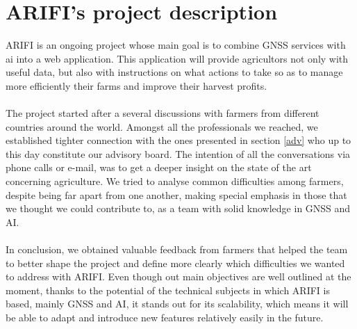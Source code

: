 \section{ARIFI's project description}

%
%
ARIFI is an ongoing project whose main goal is to combine GNSS services with \gls{ai} into a web application. This application will provide agricultors not only with useful data, but also with instructions on what actions to take so as to manage more efficiently their farms and improve their harvest profits.\\\\
%
The project started after a several discussions with farmers from different countries around the world. Amongst all the professionals we reached, we established tighter connection with the ones presented in section \ref{adv} who up to this day constitute our advisory board. The intention of all the conversations via phone calls or e-mail, was to get a deeper insight on the state of the art concerning agriculture. We tried to analyse common difficulties among farmers, despite being far apart from one another, making special emphasis in those that we thought we could contribute to, as a team with solid knowledge in GNSS and AI.\\\\
%
%
In conclusion, we obtained valuable feedback from farmers that helped the team to better shape the project and define more clearly which difficulties we wanted to address with ARIFI. Even though out main objectives are well outlined at the moment, thanks to the potential of the technical subjects in which ARIFI is based, mainly GNSS and AI, it stands out for its scalability, which means it will be able to adapt and introduce new features relatively easily in the future.

